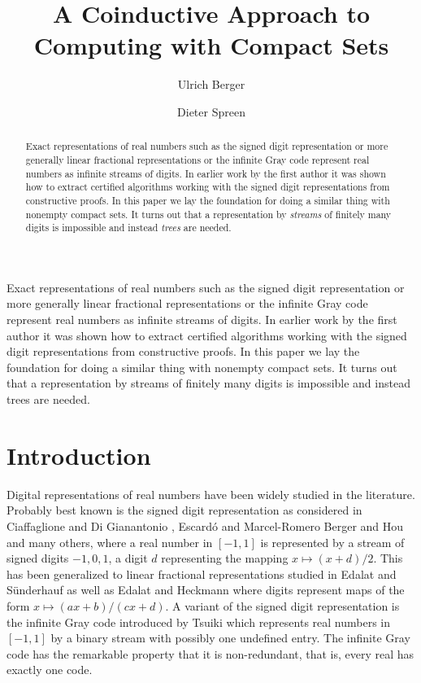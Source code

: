 \documentclass[microtype]{jloganal}
\title[A Coinductive Approach to Computing with Compact Sets]{A Coinductive Approach to Computing with Compact Sets}
\author[Ulrich Berger]{Ulrich Berger}
\author[Dieter Spreen]{Dieter Spreen}
\theoremstyle{plain}
\theoremstyle{definition}
\begin{document}
\begin{abstract}
  Exact representations of real numbers such as the signed digit
  representation or more generally linear fractional representations or the
  infinite Gray code represent real numbers as infinite streams of digits. In
  earlier work by the first author it was shown how to extract certified
  algorithms working with the signed digit representations from constructive
  proofs. In this paper we lay the foundation for doing a similar thing with
  nonempty compact sets. It turns out that a representation by \emph{streams}
  of finitely many digits is impossible and instead \emph{trees} are needed.
\end{abstract}

\begin{asciiabstract}
Exact representations of real numbers such as the signed digit
  representation or more generally linear fractional representations or the
  infinite Gray code represent real numbers as infinite streams of digits. In
  earlier work by the first author it was shown how to extract certified
  algorithms working with the signed digit representations from constructive
  proofs. In this paper we lay the foundation for doing a similar thing with
  nonempty compact sets. It turns out that a representation by streams
  of finitely many digits is impossible and instead trees are needed.
  \end{asciiabstract}
  
  \maketitle
  


\section{Introduction}
\label{sec-intro}
Digital representations of real numbers have been widely studied in the 
literature. Probably best known is the signed digit representation as 
considered in 
Ciaffaglione and Di Gian\-antonio \cite{CiaffaglioneGianantonio06}, 
Escard\'{o} and Marcel-Romero \cite{EscardoMarcial-Romero07}
Berger and Hou~\cite{BergerHou08}
and many others, 
where a real number in $[-1,1]$ is represented by a stream of 
signed digits $-1,0,1$, a digit $d$ representing the mapping 
$x \mapsto (x+d)/2$. This has been generalized
to linear fractional representations studied in Edalat and 
S\"underhauf \cite{EdalatSuenderhauf98} as well as Edalat and 
Heckmann  \cite{EdalatHeckmann02}
where digits represent maps of the form $x \mapsto (ax+b)/(cx+d)$.
A variant of the signed digit representation is the infinite
Gray code introduced by Tsuiki \cite{Tsuiki02} which represents real 
numbers in $[-1,1]$ by a binary stream
with possibly one undefined entry. The infinite Gray code has the 
remarkable property
that it is non-redundant, that is, every real has exactly one code.
\end{document}
